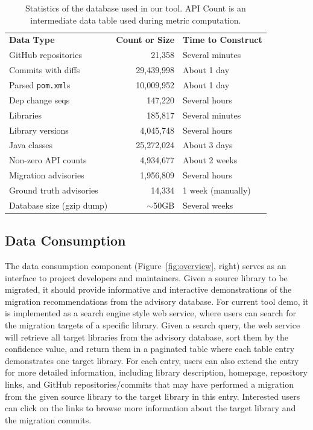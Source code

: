 \documentclass[conference,10pt]{IEEEtran}
\begin{document}
\begin{table}[t]
\caption{Statistics of the database used in our tool. API Count is an intermediate data table used during metric computation.
}
\centering
\begin{tabular}{|l|r|l|}
\hline
\textbf{Data Type} & \textbf{Count or Size} & \textbf{Time to Construct}  \\ \hhline{|=|=|=|}
GitHub repositories        & 21,358 & Several minutes   \\ \hline
Commits with diffs         & 29,439,998  & About 1 day  \\ \hline
Parsed \texttt{pom.xml}s   & 10,009,952  & About 1 day  \\ \hline
Dep change seqs            & 147,220  & Several hours \\ \hline
Libraries                  & 185,817  & Several minutes  \\ \hline
Library versions           & 4,045,748  & Several hours  \\ \hline
Java classes               & 25,272,024  & About 3 days  \\ \hline
Non-zero API counts        & 4,934,677 & About 2 weeks     \\ \hline
Migration advisories       & 1,956,809 & Several hours     \\ \hline
Ground truth advisories    & 14,334    & 1 week (manually) \\ \hline
Database size (gzip dump)  & $\sim$50GB & Several weeks     \\ \hline
\end{tabular}
\label{tab:db}
\end{table}

\subsection{Data Consumption}

The data consumption component (Figure~\ref{fig:overview}, right) serves as an interface to project developers and maintainers.
Given a source library to be migrated, it should provide informative and interactive demonstrations of the migration recommendations from the advisory database.
For current tool demo, it is implemented as a search engine style web service, where users can search for the migration targets of a specific library.
Given a search query, the web service will retrieve all target libraries from the advisory database, sort them by the confidence value, and return them in a paginated table where each table entry demonstrates one target library.
For each entry, users can also extend the entry for more detailed information, including library description, homepage, repository links, and GitHub repositories/commits that may have performed a migration from the given source library to the target library in this entry. 
Interested users can click on the links to browse more information about the target library and the migration commits.
\end{document}
